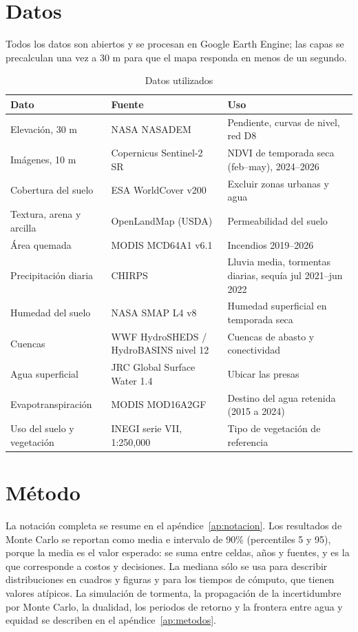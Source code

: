 \documentclass[11pt,letterpaper]{article}
\begin{document}
\section{Datos}

Todos los datos son abiertos y se procesan en Google Earth Engine; las capas se precalculan una vez a 30 m para que el mapa responda en menos de un segundo.

\begin{table}[H]\centering\small
\caption{Datos utilizados}\label{tab:datos}
\begin{tabularx}{\linewidth}{lXl}
\toprule
Dato & Fuente & Uso \\
\midrule
Elevación, 30 m & NASA NASADEM & Pendiente, curvas de nivel, red D8 \\
Imágenes, 10 m & Copernicus Sentinel-2 SR & NDVI de temporada seca (feb–may), 2024–2026 \\
Cobertura del suelo & ESA WorldCover v200 & Excluir zonas urbanas y agua \\
Textura, arena y arcilla & OpenLandMap (USDA) & Permeabilidad del suelo \\
Área quemada & MODIS MCD64A1 v6.1 & Incendios 2019–2026 \\
Precipitación diaria & CHIRPS & Lluvia media, tormentas diarias, sequía jul 2021–jun 2022 \\
Humedad del suelo & NASA SMAP L4 v8 & Humedad superficial en temporada seca \\
Cuencas & WWF HydroSHEDS / HydroBASINS nivel 12 & Cuencas de abasto y conectividad \\
Agua superficial & JRC Global Surface Water 1.4 & Ubicar las presas \\
Evapotranspiración & MODIS MOD16A2GF & Destino del agua retenida (2015 a 2024) \\
Uso del suelo y vegetación & INEGI serie VII, 1:250,000 & Tipo de vegetación de referencia \\
\bottomrule
\end{tabularx}
\end{table}

\section{Método}

La notación completa se resume en el apéndice~\ref{ap:notacion}. Los resultados de Monte Carlo se reportan como media e intervalo de 90\% (percentiles 5 y 95), porque la media es el valor esperado: se suma entre celdas, años y fuentes, y es la que corresponde a costos y decisiones. La mediana sólo se usa para describir distribuciones en cuadros y figuras y para los tiempos de cómputo, que tienen valores atípicos. La simulación de tormenta, la propagación de la incertidumbre por Monte Carlo, la dualidad, los periodos de retorno y la frontera entre agua y equidad se describen en el apéndice~\ref{ap:metodos}.
\end{document}
